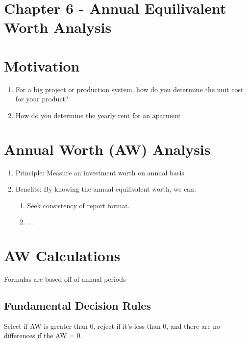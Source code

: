 \documentclass{report} %
\begin{document}
\section*{Chapter 6 - Annual Equilivalent Worth Analysis}

\section*{Motivation}
\begin{enumerate}
    \item For a big project or production system, how do you determine the unit cost for your product?
    \item How do you determine the yearly rent for an aparment 
\end{enumerate}
\section*{Annual Worth (AW) Analysis}
\begin{enumerate}
    \item Principle: Measure an investment worth on annual basis
    \item Benefits: By knowing the annual equilivalent worth, we can:
        \begin{enumerate}
            \item Seek consistency of report format.
            \item ...
        \end{enumerate}
\end{enumerate}

\section*{AW Calculations}
Formulas are based off of annual periods
\subsection*{Fundamental Decision Rules}
Select if AW is greater than 0, reject if it's less than 0, and there are no differences if the AW = 0.
\end{document}
